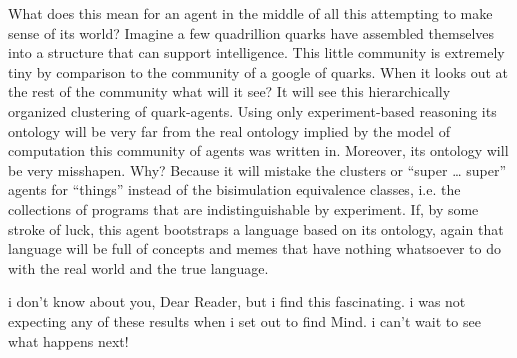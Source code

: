 What does this mean for an agent in the middle of all this attempting to make sense of its world? Imagine a few quadrillion quarks have assembled themselves into a structure that can support intelligence. This little community is extremely tiny by comparison to the community of a google of quarks. When it looks out at the rest of the community what will it see? It will see this hierarchically organized clustering of quark-agents. Using only experiment-based reasoning its ontology will be very far from the real ontology implied by the model of computation this community of agents was written in. Moreover, its ontology will be very misshapen. Why? Because it will mistake the clusters or ``super \ldots{} super'' agents for ``things'' instead of the bisimulation equivalence classes, i.e. the collections of programs that are indistinguishable by experiment. If, by some stroke of luck, this agent bootstraps a language based on its ontology, again that language will be full of concepts and memes that have nothing whatsoever to do with the real world and the true language. 

i don't know about you, Dear Reader, but i find this fascinating. i was not expecting any of these results when i set out to find Mind. i can't wait to see what happens next!
